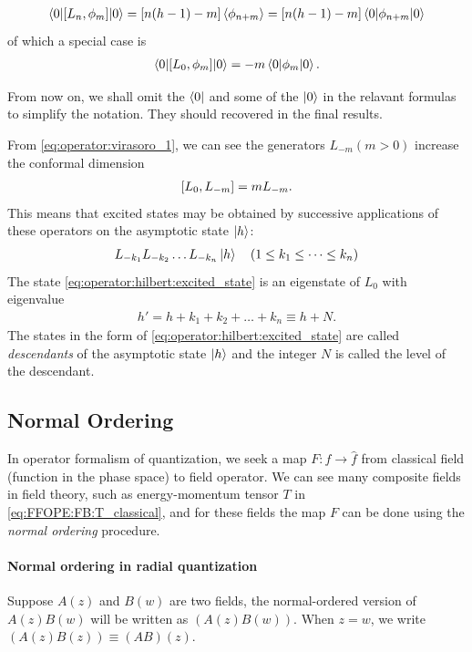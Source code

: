 \documentclass[10pt]{article}
\begin{document}
\begin{align}
    \ev**{\comm{L_n}{\phi_m}}{0}=\left[n(h-1)-m\right]\expval{\phi_{n+m}}=\left[n(h-1)-m\right]\ev**{\phi_{n+m}}{0}
\end{align}
of which a special case is
\begin{align}
    \ev**{\comm{L_0}{\phi_m}}{0}=-m\ev**{\phi_m}{0}.
\end{align}
\begin{important}
    From now on, we shall omit the $\bra{0}$ and some of the $\ket{0}$ in the relavant formulas to simplify the notation. They should recovered in the final results.
\end{important}
From \cref{eq:operator:virasoro_1}, we can see the generators $L_{-m}(m>0)$ increase the conformal dimension
\begin{align}
    \comm{L_0}{L_{-m}}=mL_{-m}.
\end{align}
This means that excited states may be obtained by successive applications of these operators on the asymptotic state $\ket{h}$:
\begin{align}
    L_{-k_1}L_{-k_2}\dots L_{-k_n}\ket{h}\quad(1\leq k_1\leq\dots\leq k_n)\label{eq:operator:hilbert:excited_state}
\end{align}
The state \cref{eq:operator:hilbert:excited_state} is an eigenstate of $L_0$ with eigenvalue
\begin{align}
    h'=h+k_1+k_2+\dots+k_n\equiv h+N.
\end{align}
The states in the form of \cref{eq:operator:hilbert:excited_state} are called \textit{descendants} of the asymptotic state $\ket{h}$ and the integer $N$ is called the level of the descendant.


\subsection{Normal Ordering\label{subsec:operator:normal_ordering}}
\begin{intu}
    In operator formalism of quantization, we seek a map $F:f\to\hat{f}$ from classical field (function in the phase space) to field operator.
    We can see many composite fields in field theory, such as energy-momentum tensor $T$ in \cref{eq:FFOPE:FB:T_classical}, and for these fields the map $F$ can be done using the \textit{normal ordering} procedure.
\end{intu}
\paragraph{Normal ordering in radial quantization}
Suppose $A(z)$ and $B(w)$ are two fields, the normal-ordered version of $A(z)B(w)$ will be written as $(A(z)B(w))$.
When $z=w$, we write $(A(z)B(z))\equiv(AB)(z)$.
\end{document}

